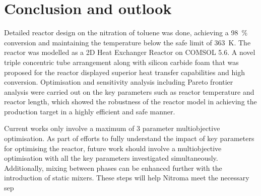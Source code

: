 \section{Conclusion and outlook} \label{sec:conclusion}
Detailed reactor design on the nitration of toluene was done, achieving a \SI{98}{\%} conversion and maintaining the temperature below the safe limit of \SI{363}{\K}. The reactor was modelled as a 2D Heat Exchanger Reactor on COMSOL 5.6. A novel triple concentric tube arrangement along with silicon carbide foam that was proposed for the reactor displayed superior heat transfer capabilities and high conversion. Optimisation and sensitivity analysis including Pareto frontier analysis were carried out on the key parameters such as reactor temperature and reactor length, which showed the robustness of the reactor model in achieving the production target in a highly efficient and safe manner. 

Current works only involve a maximum of 3 parameter multiobjective optimisation. As part of efforts to fully understand the impact of key parameters for optimising the reactor, future work should involve a multiobjective optimisation with all the key parameters investigated simultaneously. Additionally, mixing between phases can be enhanced further with the introduction of static mixers. These steps will help Nitroma meet the necessary sep 


